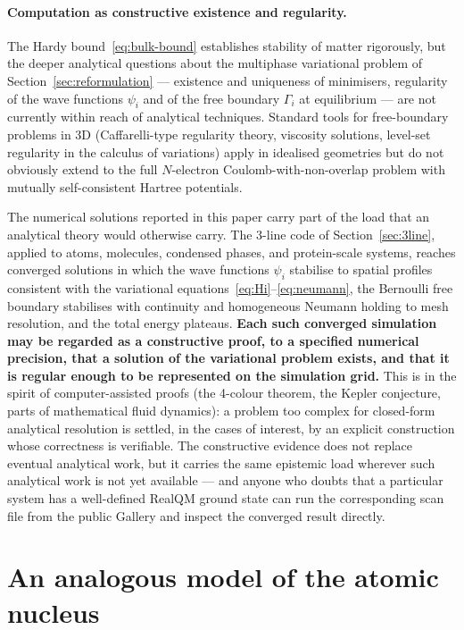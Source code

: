 \documentclass[11pt]{article}
\begin{document}
\paragraph{Computation as constructive existence and regularity.}
The Hardy bound~\eqref{eq:bulk-bound} establishes stability of matter rigorously, but the deeper analytical questions about the multiphase variational problem of Section~\ref{sec:reformulation} --- existence and uniqueness of minimisers, regularity of the wave functions $\psi_i$ and of the free boundary $\Gamma_i$ at equilibrium --- are not currently within reach of analytical techniques. Standard tools for free-boundary problems in 3D (Caffarelli-type regularity theory, viscosity solutions, level-set regularity in the calculus of variations) apply in idealised geometries but do not obviously extend to the full $N$-electron Coulomb-with-non-overlap problem with mutually self-consistent Hartree potentials.

The numerical solutions reported in this paper carry part of the load that an analytical theory would otherwise carry. The 3-line code of Section~\ref{sec:3line}, applied to atoms, molecules, condensed phases, and protein-scale systems, reaches converged solutions in which the wave functions $\psi_i$ stabilise to spatial profiles consistent with the variational equations~\eqref{eq:Hi}--\eqref{eq:neumann}, the Bernoulli free boundary stabilises with continuity and homogeneous Neumann holding to mesh resolution, and the total energy plateaus. \textbf{Each such converged simulation may be regarded as a constructive proof, to a specified numerical precision, that a solution of the variational problem exists, and that it is regular enough to be represented on the simulation grid.} This is in the spirit of computer-assisted proofs (the 4-colour theorem, the Kepler conjecture, parts of mathematical fluid dynamics): a problem too complex for closed-form analytical resolution is settled, in the cases of interest, by an explicit construction whose correctness is verifiable. The constructive evidence does not replace eventual analytical work, but it carries the same epistemic load wherever such analytical work is not yet available --- and anyone who doubts that a particular system has a well-defined RealQM ground state can run the corresponding scan file from the public Gallery and inspect the converged result directly.

\section{An analogous model of the atomic nucleus}\label{sec:nucleus}
\end{document}
